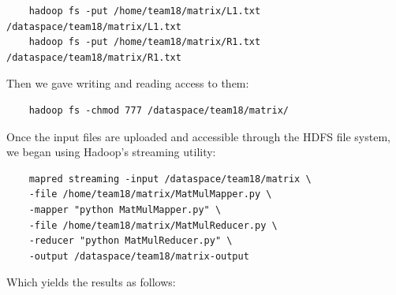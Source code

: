 \lstset{language=command.com}
\begin{lstlisting}
    hadoop fs -put /home/team18/matrix/L1.txt /dataspace/team18/matrix/L1.txt
    hadoop fs -put /home/team18/matrix/R1.txt /dataspace/team18/matrix/R1.txt
\end{lstlisting}

Then we gave writing and reading access to them:

\begin{lstlisting}
    hadoop fs -chmod 777 /dataspace/team18/matrix/
\end{lstlisting}

Once the input files are uploaded and accessible through the HDFS file system, we began using Hadoop’s streaming utility:

\begin{lstlisting}
    mapred streaming -input /dataspace/team18/matrix \
	-file /home/team18/matrix/MatMulMapper.py \
	-mapper "python MatMulMapper.py" \
	-file /home/team18/matrix/MatMulReducer.py \
	-reducer "python MatMulReducer.py" \
	-output /dataspace/team18/matrix-output
\end{lstlisting}

Which yields the results as follows:

